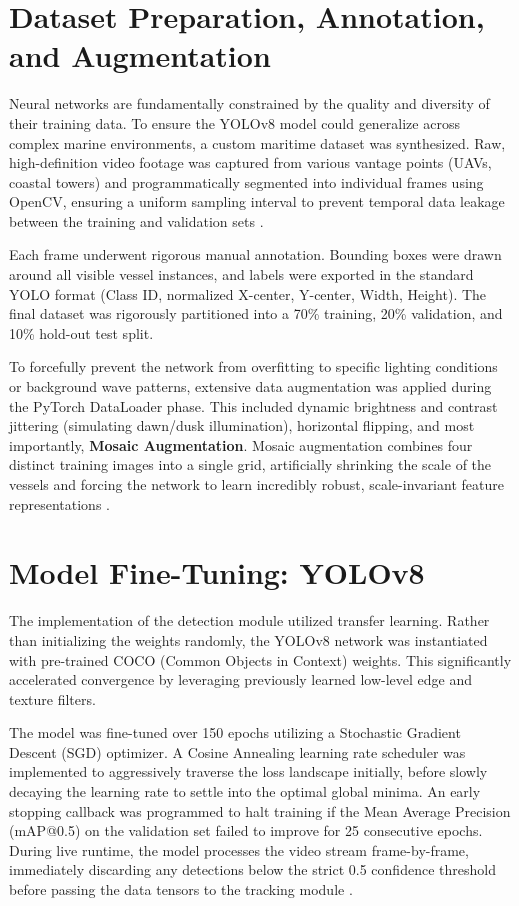 \section{Dataset Preparation, Annotation, and Augmentation}
Neural networks are fundamentally constrained by the quality and diversity of their training data. To ensure the YOLOv8 model could generalize across complex marine environments, a custom maritime dataset was synthesized. Raw, high-definition video footage was captured from various vantage points (UAVs, coastal towers) and programmatically segmented into individual frames using OpenCV, ensuring a uniform sampling interval to prevent temporal data leakage between the training and validation sets \citep{Ref12}.

Each frame underwent rigorous manual annotation. Bounding boxes were drawn around all visible vessel instances, and labels were exported in the standard YOLO format (Class ID, normalized X-center, Y-center, Width, Height). The final dataset was rigorously partitioned into a 70\% training, 20\% validation, and 10\% hold-out test split. 

To forcefully prevent the network from overfitting to specific lighting conditions or background wave patterns, extensive data augmentation was applied during the PyTorch DataLoader phase. This included dynamic brightness and contrast jittering (simulating dawn/dusk illumination), horizontal flipping, and most importantly, \textbf{Mosaic Augmentation}. Mosaic augmentation combines four distinct training images into a single grid, artificially shrinking the scale of the vessels and forcing the network to learn incredibly robust, scale-invariant feature representations \citep{Ref13}.

\section{Model Fine-Tuning: YOLOv8}
The implementation of the detection module utilized transfer learning. Rather than initializing the weights randomly, the YOLOv8 network was instantiated with pre-trained COCO (Common Objects in Context) weights. This significantly accelerated convergence by leveraging previously learned low-level edge and texture filters. 

The model was fine-tuned over 150 epochs utilizing a Stochastic Gradient Descent (SGD) optimizer. A Cosine Annealing learning rate scheduler was implemented to aggressively traverse the loss landscape initially, before slowly decaying the learning rate to settle into the optimal global minima. An early stopping callback was programmed to halt training if the Mean Average Precision (mAP@0.5) on the validation set failed to improve for 25 consecutive epochs. During live runtime, the model processes the video stream frame-by-frame, immediately discarding any detections below the strict 0.5 confidence threshold before passing the data tensors to the tracking module \citep{Ref14}.

